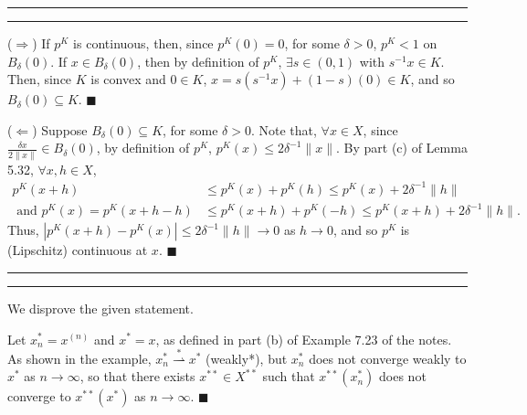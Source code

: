 \documentclass[11pt]{article}
\newcounter{questionCounter}
\newcounter{partCounter}[questionCounter]
\newenvironment{question}[2][\arabic{questionCounter}]{%
    \setcounter{partCounter}{0}%
    \vspace{.25in} \hrule \vspace{0.5em}%
        \noindent{\bf #2}%
    \vspace{0.8em} \hrule \vspace{.10in}%
    \addtocounter{questionCounter}{1}%
}{}
\renewcommand{\qed}{\quad $\blacksquare$}
\newcommand{\inv}{^{-1}}
\begin{document}
\begin{question}{Problem 9}
($\Rightarrow$) If $p^K$ is continuous, then, since $p^K(0) = 0$, for some
$\delta > 0$, $p^K < 1$ on $B_{\delta}(0)$. If $x \in B_{\delta}(0)$, then
by definition of $p^K$, $\exists s \in (0,1)$ with $s\inv x \in K$. Then, since
$K$ is convex and $0 \in K$, $x = s(s\inv x) + (1 - s)(0) \in K$, and so
$B_{\delta}(0) \subseteq K$. \qed

($\Leftarrow$) Suppose $B_{\delta}(0) \subseteq K$, for some $\delta > 0$. Note
that, $\forall x \in X$, since $\frac{\delta x}{2\|x\|} \in B_{\delta}(0)$, by
definition of $p^K$, $p^K(x) \leq 2\delta\inv\|x\|$. By part (c) of Lemma 5.32,
$\forall x, h \in X$,
\begin{align*}
p^K(x + h)
 &  \leq p^K(x) + p^K(h)
    \leq p^K(x) + 2\delta\inv \|h\| \\
\mbox{ and } 
p^K(x)
    =    p^K(x + h - h)
 &  \leq p^K(x + h) + p^K(-h)
    \leq p^K(x + h) + 2\delta\inv \|h\|.
\end{align*}
Thus, $|p^K(x + h) - p^K(x)| \leq 2\delta\inv \|h\| \rightarrow 0$ as
$h \rightarrow 0$, and so $p^K$ is (Lipschitz) continuous at $x$. \qed
\end{question}

\begin{question}{Problem 10}
We disprove the given statement.

Let $x_n^* = x^{(n)}$ and $x^* = x$, as defined in part (b) of Example 7.23 of
the notes. As shown in the example, $x_n^* \stackrel{*}{\rightharpoonup} x^*$
(weakly*), but $x_n^*$ does not converge weakly to $x^*$ as
$n \rightarrow \infty$, so that there exists $x^{**} \in X^{**}$ such that
$x^{**}(x_n^*)$ does not converge to $x^{**}(x^*)$ as $n \rightarrow \infty$.
\qed
\end{question}
\end{document}
